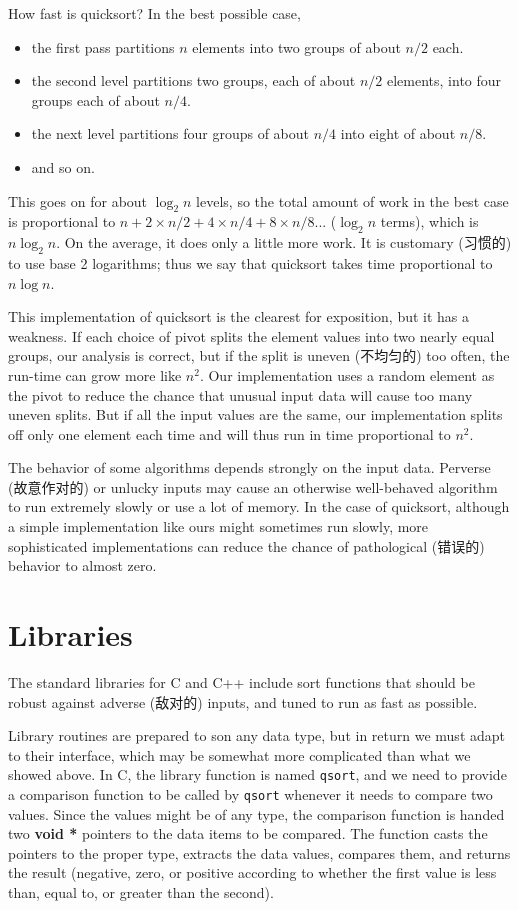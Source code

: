 How fast is quicksort? In the best possible case,
\begin{itemize}
\item the first pass partitions $n$ elements into two groups of about $n/2$
    each.
\item the second level partitions two groups, each of about $n/2$ elements,
    into four groups each of about $n/4$.
\item the next level partitions four groups of about $n/4$ into eight of
    about $n/8$.
\item and so on.
\end{itemize}

This goes on for about $\log_2 n$ levels, so the total amount of work in
the best case is proportional to $n + 2\times n/2 + 4\times n/4 + 8\times
n/8 ... $ ($\log_2 n$ terms), which is $n\log_2 n$. On the average, it does
only a little more work. It is customary (习惯的) to use base 2 logarithms;
thus we say that quicksort takes time proportional to $n\log n$.

This implementation of quicksort is the clearest for exposition, but it has
a weakness. If each choice of pivot splits the element values into two
nearly equal groups, our analysis is correct, but if the split is uneven
(不均匀的) too often, the run-time can grow more like $n^2$. Our
implementation uses a random element as the pivot to reduce the chance that
unusual input data will cause too many uneven splits. But if all the input
values are the same, our implementation splits off only one element each
time and will thus run in time proportional to $n^2$.

The behavior of some algorithms depends strongly on the input data.
Perverse (故意作对的) or unlucky inputs may cause an otherwise well-behaved
algorithm to run extremely slowly or use a lot of memory. In the case of
quicksort, although a simple implementation like ours might sometimes run
slowly, more sophisticated implementations can reduce the chance of
pathological (错误的) behavior to almost zero.

\section{Libraries}
\label{sec:libraries}

The standard libraries for C and C++ include sort functions that should be
robust against adverse (敌对的) inputs, and tuned to run as fast as
possible.

Library routines are prepared to son any data type, but in return we must
adapt to their interface, which may be somewhat more complicated than what
we showed above. In C, the library function is named \verb'qsort', and we
need to provide a comparison function to be called by \verb'qsort' whenever
it needs to compare two values. Since the values might be of any type, the
comparison function is handed two \textbf{void *} pointers to the data
items to be compared. The function casts the pointers to the proper type,
extracts the data values, compares them, and returns the result (negative,
zero, or positive according to whether the first value is less than, equal
to, or greater than the second).

